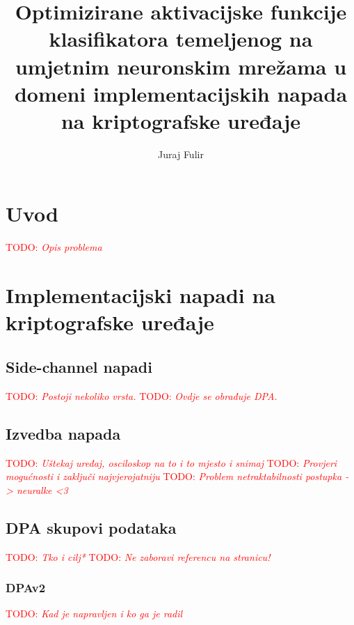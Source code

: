 \documentclass[times, utf8, numeric, diplomski]{fer}
\def\TODO#1{\noindent\textcolor{red}{TODO: \textit{#1}}\newline}
\def\todo#1{\TODO{#1}}
\begin{document}

\title{Optimizirane aktivacijske funkcije klasifikatora temeljenog na umjetnim neuronskim mrežama u domeni implementacijskih napada na kriptografske uređaje}

\author{Juraj Fulir}

\maketitle

\izvornik


\tableofcontents

\chapter{Uvod}
\todo{ Opis problema }

\chapter{Implementacijski napadi na kriptografske uređaje}

\section{Side-channel napadi}
\todo{ Postoji nekoliko vrsta.}
\todo{ Ovdje se obrađuje DPA.}

\section{Izvedba napada}
\todo{ Uštekaj uređaj, osciloskop na to i to mjesto i snimaj}
\todo{ Provjeri mogućnosti i zaključi najvjerojatniju}
\todo{ Problem netraktabilnosti postupka -> neuralke <3}

\section{DPA skupovi podataka}
\label{sec:dpa_datasets}
\todo{Tko i cilj*}
\todo{Ne zaboravi referencu na stranicu!}

\subsection{DPAv2}
\todo{Kad je napravljen i ko ga je radil}
\end{document}
